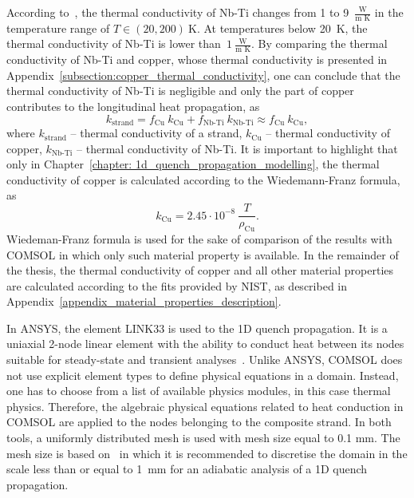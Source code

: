 According to~\cite[p.~46]{material_props_for_heat_transfer_modelling_in_nb3sn_magnets}, the thermal conductivity of Nb-Ti changes from 1 to 9~$\frac{\text{W}}{\text{m K}}$ in the temperature range of $T \in (20, 200)~\text{K}$. At temperatures below 20~K, the thermal conductivity of Nb-Ti is lower than~$1~\frac{\text{W}}{\text{m K}}$. By comparing the thermal conductivity of Nb-Ti and copper, whose thermal conductivity is presented in Appendix~\ref{subsection:copper_thermal_conductivity}, one can conclude that the thermal conductivity of Nb-Ti is negligible and only the part of copper contributes to the longitudinal heat propagation, as 
\begin{equation}
    k_\text{strand} = f_\text{Cu} ~ k_\text{Cu} + f_\text{Nb-Ti} ~ k_\text{Nb-Ti} \approx  f_\text{Cu} ~ k_\text{Cu},
    \label{eqn: k_equiv}
\end{equation}
where $k_\text{strand}$ -- thermal conductivity of a strand, $k_\text{Cu}$ -- thermal conductivity of copper, $k_\text{Nb-Ti}$ -- thermal conductivity of Nb-Ti. It is important to highlight that only in Chapter~\ref{chapter: 1d_quench_propagation_modelling}, the thermal conductivity of copper is calculated according to the Wiedemann-Franz formula, as
\begin{equation}
    k_\text{Cu} = 2.45 \cdot 10^{-8} ~ \frac{T}{\rho_\text{Cu}}.
    \label{eqn: k_cu_wiedemann_franz}
\end{equation}
Wiedeman-Franz formula is used for the sake of comparison of the results with COMSOL in which only such material property is available. In the remainder of the thesis, the thermal conductivity of copper and all other material properties are calculated according to the fits provided by NIST, as described in Appendix~\ref{appendix_material_properties_description}. 

In ANSYS, the element LINK33 is used to the 1D quench propagation. It is a uniaxial 2-node linear element with the ability to conduct heat between its nodes suitable for steady-state and transient analyses~\cite{ansys_element_manual}. Unlike ANSYS, COMSOL does not use explicit element types to define physical equations in a domain. Instead, one has to choose from a list of available physics modules, in this case thermal physics. Therefore, the algebraic physical equations related to heat conduction in COMSOL are applied to the nodes belonging to the composite strand. In both tools, a uniformly distributed mesh is used with mesh size equal to 0.1 mm. The mesh size is based on~\cite[p.~40]{paudel_thesis} in which it is recommended to discretise the domain in the scale less than or equal to 1~mm for an adiabatic analysis of a 1D quench propagation.

